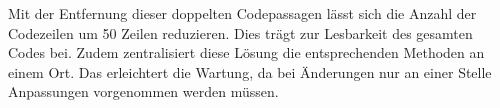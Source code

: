 Mit der Entfernung dieser doppelten Codepassagen lässt sich die Anzahl der Codezeilen um 50 Zeilen reduzieren. Dies trägt zur Lesbarkeit des gesamten Codes bei. Zudem zentralisiert diese Lösung die entsprechenden Methoden an einem Ort. Das erleichtert die Wartung, da bei Änderungen nur an einer Stelle Anpassungen vorgenommen werden müssen.